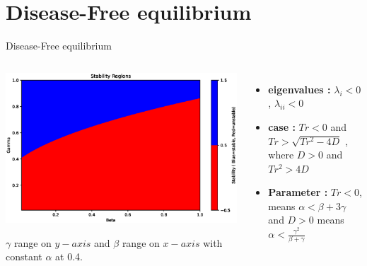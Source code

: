 \documentclass[smaller,aspectratio=169, toc=bibliography]{beamer}
\begin{document}
\section*{Disease-Free equilibrium}
\begin{frame}{Disease-Free equilibrium}
\begin{columns}
\begin{center}
\includegraphics[width=\linewidth]{img/stability.eps}
\caption{$\gamma$ range on $y-axis$ and $\beta$ range on $x-axis$ with constant $\alpha$ at 0.4.}
\label{regions of stability and unstability}
\end{center}
\begin{itemize}
\item \textbf{eigenvalues :} $\lambda_{i} < 0$, $\lambda_{ii} < 0$
\item \textbf{case :} $ Tr < 0$ and $Tr > \sqrt{Tr^2-4D} $ , where  $D > 0$ and $Tr^2 > 4D $
\item \textbf{Parameter :} $ Tr < 0 $, means \( \alpha < \beta + 3\gamma \) and $ D > 0 $ means \( \alpha < \frac{\gamma^2}{\beta + \gamma} \)
\end{itemize}
\end{columns}
\end{frame}
\end{document}
